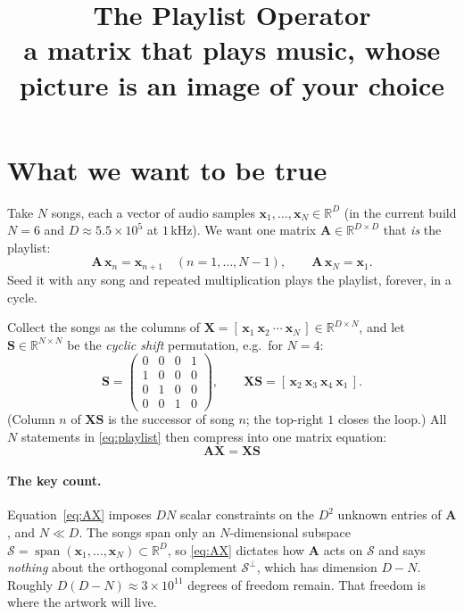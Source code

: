 \documentclass[11pt]{article}
\title{\vspace{-1.2em}The Playlist Operator\\
\large a matrix that plays music, whose picture is an image of your choice}
\author{}
\date{}
\newcommand{\mA}{\bm{A}}
\newcommand{\mX}{\bm{X}}
\newcommand{\mS}{\bm{S}}
\newcommand{\vx}{\bm{x}}
\newcommand{\R}{\mathbb{R}}
\newcommand{\spanof}{\operatorname{span}}
\begin{document}
\maketitle
\vspace{-3.5em}

\section{What we want to be true}

Take $N$ songs, each a vector of audio samples
$\vx_1,\dots,\vx_N \in \R^D$ (in the current build $N=6$ and
$D \approx 5.5\times10^5$ at $1$\,kHz). We want one matrix
$\mA \in \R^{D\times D}$ that \emph{is} the playlist:
\begin{equation}
  \mA\,\vx_n = \vx_{n+1} \quad (n=1,\dots,N-1),
  \qquad
  \mA\,\vx_N = \vx_1 .
  \label{eq:playlist}
\end{equation}
Seed it with any song and repeated multiplication plays the playlist,
forever, in a cycle.

Collect the songs as the columns of
$\mX = [\,\vx_1\ \vx_2\ \cdots\ \vx_N\,] \in \R^{D\times N}$, and let
$\mS \in \R^{N\times N}$ be the \emph{cyclic shift} permutation, e.g.\ for
$N=4$:
\begin{equation}
  \mS =
  \begin{pmatrix}
    0 & 0 & 0 & 1\\
    1 & 0 & 0 & 0\\
    0 & 1 & 0 & 0\\
    0 & 0 & 1 & 0
  \end{pmatrix},
  \qquad
  \mX\mS = [\,\vx_2\ \vx_3\ \vx_4\ \vx_1\,].
\end{equation}
(Column $n$ of $\mX\mS$ is the successor of song $n$; the top-right $1$
closes the loop.) All $N$ statements in \eqref{eq:playlist} then compress
into one matrix equation:
\begin{equation}
  \boxed{\ \mA\mX = \mX\mS\ }
  \label{eq:AX}
\end{equation}

\paragraph{The key count.}
Equation~\eqref{eq:AX} imposes $DN$ scalar constraints on the $D^2$ unknown
entries of $\mA$, and $N \ll D$. The songs span only an $N$-dimensional
subspace $\mathcal S = \spanof(\vx_1,\dots,\vx_N) \subset \R^D$, so
\eqref{eq:AX} dictates how $\mA$ acts on $\mathcal S$ and says
\emph{nothing} about the orthogonal complement $\mathcal S^{\perp}$, which
has dimension $D-N$. Roughly $D(D-N) \approx 3\times10^{11}$ degrees of
freedom remain. That freedom is where the artwork will live.
\end{document}
